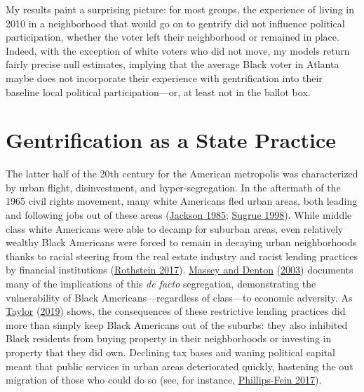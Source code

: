 \documentclass[
  12pt,
]{article}
\begin{document}
My results paint a surprising picture: for most groups, the experience of living in 2010 in a neighborhood that would go on to gentrify did not influence political participation, whether the voter left their neighborhood or remained in place. Indeed, with the exception of white voters who did not move, my models return fairly precise null estimates, implying that the average Black voter in Atlanta maybe does not incorporate their experience with gentrification into their baseline local political participation---or, at least not in the ballot box.

\hypertarget{gentrification-as-a-state-practice}{%
\section{Gentrification as a State Practice}\label{gentrification-as-a-state-practice}}

The latter half of the 20th century for the American metropolis was characterized by urban flight, disinvestment, and hyper-segregation. In the aftermath of the 1965 civil rights movement, many white Americans fled urban areas, both leading and following jobs out of these areas (\protect\hyperlink{ref-Jackson1985}{Jackson 1985}; \protect\hyperlink{ref-Sugrue1998}{Sugrue 1998}). While middle class white Americans were able to decamp for suburban areas, even relatively wealthy Black Americans were forced to remain in decaying urban neighborhoods thanks to racial steering from the real estate industry and racist lending practices by financial institutions (\protect\hyperlink{ref-Rothstein2017}{Rothstein 2017}). \protect\hyperlink{ref-Massey2003}{Massey and Denton} (\protect\hyperlink{ref-Massey2003}{2003}) documents many of the implications of this \emph{de facto} segregation, demonstrating the vulnerability of Black Americans---regardless of class---to economic adversity. As \protect\hyperlink{ref-Taylor2019}{Taylor} (\protect\hyperlink{ref-Taylor2019}{2019}) shows, the consequences of these restrictive lending practices did more than simply keep Black Americans out of the suburbs: they also inhibited Black residents from buying property in their neighborhoods or investing in property that they did own. Declining tax bases and waning political capital meant that public services in urban areas deteriorated quickly, hastening the out migration of those who could do so (see, for instance, \protect\hyperlink{ref-Phillips-Fein2017}{Phillips-Fein 2017}).
\end{document}

